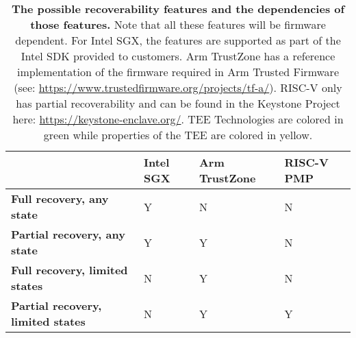 \begin{table*}[p]
\begin{center}
\begin{tabular}{|l|l|l|l|}
\hline
\textbf{}                                                         & \cellcolor{tbl-gre}\textbf{Intel SGX} & \cellcolor{tbl-gre}\textbf{Arm TrustZone} & \cellcolor{tbl-gre}\textbf{RISC-V PMP} \\ \hline
\cellcolor{tbl-yel}\textbf{Full recovery, any state}         & Y                                          & N                                              & N                                           \\ \hline
\cellcolor{tbl-yel}\textbf{Partial recovery, any state}      & Y                                          & Y                                              & N                                           \\ \hline
\cellcolor{tbl-yel}\textbf{Full recovery, limited states}    & N                                          & Y                                              & N                                           \\ \hline
\cellcolor{tbl-yel}\textbf{Partial recovery, limited states} & N                                          & Y                                              & Y                                           \\ \hline
\end{tabular}
\end{center}
\caption[Recoverability Comparison]{\textbf{The possible recoverability features and the dependencies of those features.} Note that all these features will be firmware dependent. For Intel SGX, the features are supported as part of the Intel SDK provided to customers. Arm TrustZone has a reference implementation of the firmware required in Arm Trusted Firmware (see: \url{https://www.trustedfirmware.org/projects/tf-a/}). RISC-V only has partial recoverability and can be found in the Keystone Project here: \url{https://keystone-enclave.org/}. TEE Technologies are colored in \colorbox{tbl-gre}{green} while properties of the TEE are colored in \colorbox{tbl-yel}{yellow}.}
\label{tab:recover-compare}
\end{table*}

